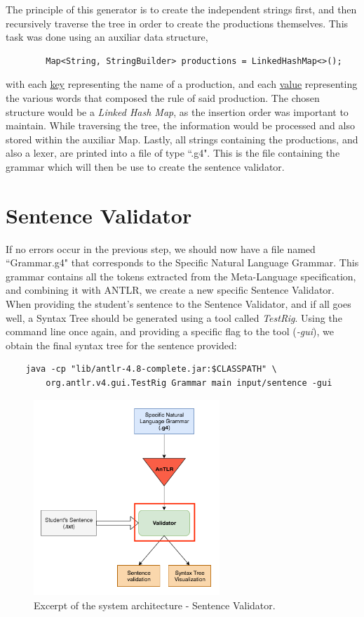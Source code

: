 The principle of this generator is to create the independent strings first, and then recursively traverse the tree in order to create the productions themselves.
This task was done using an auxiliar data structure,
\begin{verbatim}
        Map<String, StringBuilder> productions = LinkedHashMap<>();
\end{verbatim}
\noindent with each \underline{key} representing the name of a production, and each \underline{value} representing the various words that composed the rule of said production.
The chosen structure would be a \emph{Linked Hash Map}, as the insertion order was important to maintain.
While traversing the tree, the information would be processed and also stored within the auxiliar Map.
Lastly, all strings containing the productions, and also a lexer, are printed into a file of type ``.g4". 
This is the file containing the grammar which will then be use to create the sentence validator.


\section{Sentence Validator}

If no errors occur in the previous step, we should now have a file named ``Grammar.g4" that corresponds to the Specific Natural Language Grammar.
This grammar contains all the tokens extracted from the Meta-Language specification, and combining it with ANTLR, we create a new specific Sentence Validator.
When providing the student's sentence to the Sentence Validator, and if all goes well, a Syntax Tree should be generated using a tool called \emph{TestRig}.
Using the command line once again, and providing a specific flag to the tool (\emph{-gui}), we obtain the final syntax tree for the sentence provided: 
\begin{Verbatim}
	java -cp "lib/antlr-4.8-complete.jar:$CLASSPATH" \
	    org.antlr.v4.gui.TestRig Grammar main input/sentence -gui
\end{Verbatim}

\begin{figure}[h]
    \centering
    \includegraphics[width=7cm]{images/system_sentence_validator.png}
    \caption{Excerpt of the system architecture - Sentence Validator.}
    \label{fig:systemSentenceValidator}
\end{figure}

